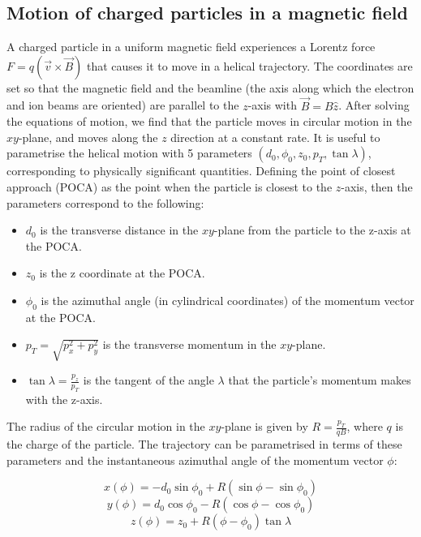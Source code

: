 \documentclass[titlepage]{article}[11pt]
\begin{document}
\subsection{Motion of charged particles in a magnetic field}
A charged particle in a uniform magnetic field experiences a Lorentz force $F = q(\vec{v} \times \vec{B})$ that causes it to move in a helical trajectory. The coordinates are set so that the magnetic field and the beamline (the axis along which the electron and ion beams are oriented) are parallel to the $z$-axis with $\vec{B} = B \hat{z}$. After solving the equations of motion, we find that the particle moves in circular motion in the $xy$-plane, and moves along the $z$ direction at a constant rate. It is useful to parametrise the helical motion with 5 parameters $\left(d_0, \phi_0, z_0, p_T, \tan \lambda \right)$, corresponding to physically significant quantities. Defining the point of closest approach (POCA) as the point when the particle is closest to the $z$-axis, then the parameters correspond to the following:

\begin{itemize}
	\item $d_0$ is the transverse distance in the $xy$-plane from the particle to the z-axis at the POCA.
	\item $z_0$ is the z coordinate at the POCA.
	\item $\phi_0$ is the azimuthal angle (in cylindrical coordinates) of the momentum vector at the POCA.
	\item $p_T = \sqrt{p_x^2 + p_y^2}$ is the transverse momentum in the $xy$-plane.
	\item $\tan \lambda = \frac{p_z}{p_T}$ is the tangent of the angle $\lambda$ that the particle's momentum makes with the z-axis.
\end{itemize}

\noindent
The radius of the circular motion in the $xy$-plane is given by $R = \frac{p_T}{qB}$, where $q$ is the charge of the particle. The trajectory can be parametrised in terms of these parameters and the instantaneous azimuthal angle of the momentum vector $\phi$:

\begin{equation}
	x(\phi) = -d_0 \sin \phi_0 + R \left(\sin \phi - \sin \phi_0 \right)
\end{equation}
\begin{equation}
	y(\phi) = d_0 \cos \phi_0 - R \left(\cos \phi - \cos \phi_0 \right)
\end{equation}
\begin{equation}
	z(\phi) = z_0 + R \left(\phi - \phi_0 \right) \tan \lambda
\end{equation}
\end{document}
